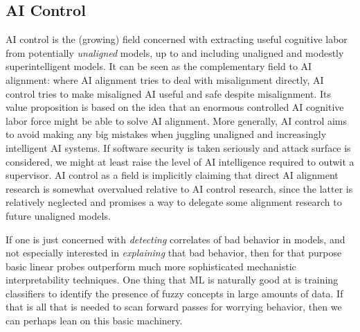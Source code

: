 \subsection{AI Control}
AI control \cite{greenblatt2024aicontrol} is the (growing) field concerned with
extracting useful cognitive labor from potentially \emph{unaligned} models, up
to and including unaligned and modestly superintelligent models. It can be seen
as the complementary field to AI alignment: where AI alignment tries to deal
with misalignment directly, AI control tries to make misaligned AI useful and
safe despite misalignment. Its value proposition is based on the idea that an
enormous controlled AI cognitive labor force might be able to solve AI
alignment. More generally, AI control aims to avoid making any big mistakes
when juggling unaligned and increasingly intelligent AI systems. If software
security is taken seriously and attack surface is considered, we might at least
raise the level of AI intelligence required to outwit a supervisor. AI control
as a field is implicitly claiming that direct AI alignment research is somewhat
overvalued relative to AI control research, since the latter is relatively
neglected and promises a way to delegate some alignment research to future
unaligned models.

If one is just concerned with \emph{detecting} correlates of bad behavior in
models, and not especially interested in \emph{explaining} that bad behavior,
then for that purpose basic linear probes outperform much more sophisticated
mechanistic interpretability techniques. One thing that ML is naturally good at
is training classifiers to identify the presence of fuzzy concepts in large
amounts of data. If that is all that is needed to scan forward passes for
worrying behavior, then we can perhaps lean on this basic machinery.

